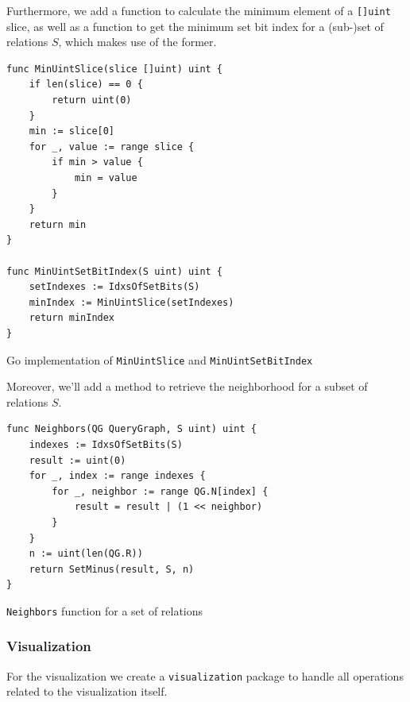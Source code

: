 Furthermore, we add a function to calculate the minimum element of a \texttt{[]uint} slice, as well as a function to get the minimum set bit index for a (sub-)set of relations $S$, which makes use of the former.

\begin{algorithm}[H]
\begin{verbatim}
func MinUintSlice(slice []uint) uint {
    if len(slice) == 0 {
        return uint(0)
    }
    min := slice[0]
    for _, value := range slice {
        if min > value {
            min = value
        }
    }
    return min
}

func MinUintSetBitIndex(S uint) uint {
	setIndexes := IdxsOfSetBits(S)
	minIndex := MinUintSlice(setIndexes)
	return minIndex
}
\end{verbatim}
\caption{Go implementation of \texttt{MinUintSlice} and \texttt{MinUintSetBitIndex}}
\label{alg:implementation-minuintslice}
\end{algorithm}
\vspace{0.5cm}


Moreover, we'll add a method to retrieve the neighborhood for a subset of relations $S$.

\begin{algorithm}[H]
\begin{verbatim}
func Neighbors(QG QueryGraph, S uint) uint {
    indexes := IdxsOfSetBits(S)
    result := uint(0)
    for _, index := range indexes {
        for _, neighbor := range QG.N[index] {
            result = result | (1 << neighbor)
        }
    }
    n := uint(len(QG.R))
    return SetMinus(result, S, n)
}
\end{verbatim}
\caption{\texttt{Neighbors} function for a set of relations}
\end{algorithm}
\vspace{0.5cm}

\subsubsection{Visualization}
\label{subsub:implementation-visualization}

For the visualization we create a \texttt{visualization} package to handle all operations related to the visualization itself. 

